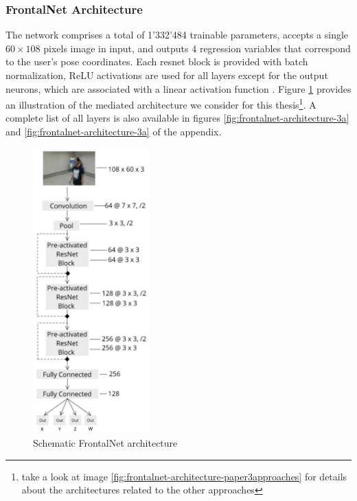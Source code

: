\subsubsection{FrontalNet Architecture}
\label{subsec:frontalnet-architecture}

The network comprises a total of 1'332'484 trainable parameters, accepts a single $60 \times 108$ pixels image in input, and outputs 4 regression variables that correspond to the user's pose coordinates. Each \gls{resnet} block is provided with batch normalization, ReLU activations \cite{act-relu} are used for all layers except for the output neurons, which are associated with a linear activation function \cite{act-linear}. Figure \ref{fig:frontalnet-architecture-1} provides an illustration of the mediated architecture we consider for this thesis\footnote{take a look at image \ref{fig:frontalnet-architecture-paper3approaches} for details about the architectures related to the other approaches}. A complete list of all layers is also available in figures \ref{fig:frontalnet-architecture-3a} and \ref{fig:frontalnet-architecture-3a} of the appendix. 

\begin{figure}[!h]
	\centering
	\includegraphics[width=0.4\textwidth]{"contents/images/03-frontalnet-1A"}
	\caption[Schematic FrontalNet architecture]{Schematic FrontalNet architecture \cite{mantegazza2019visionbased}}
	\label{fig:frontalnet-architecture-1}
\end{figure}


